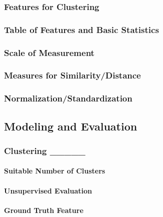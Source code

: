 \documentclass[
]{article}
\begin{document}
\subsubsection{Features for Clustering}\label{features-for-clustering-2}

\subsubsection{Table of Features and Basic
Statistics}\label{table-of-features-and-basic-statistics-2}

\subsubsection{Scale of Measurement}\label{scale-of-measurement-2}

\subsubsection{Measures for
Similarity/Distance}\label{measures-for-similaritydistance-2}

\subsubsection{Normalization/Standardization}\label{normalizationstandardization-2}

\subsection{Modeling and Evaluation}\label{modeling-and-evaluation-2}

\subsubsection{Clustering \_\_\_\_\_}\label{clustering-_____}

\paragraph{Suitable Number of
Clusters}\label{suitable-number-of-clusters-4}

\paragraph{Unsupervised Evaluation}\label{unsupervised-evaluation-4}

\paragraph{Ground Truth Feature}\label{ground-truth-feature-4}
\end{document}
